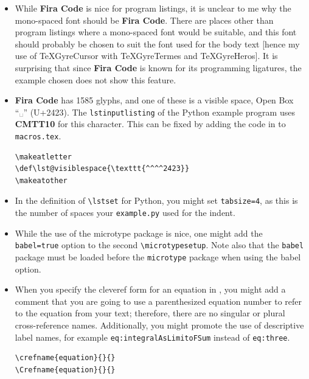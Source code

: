 \documentclass[12pt, twoside]{article}
\newcommand{\fname}[1]{\texttt{#1}}
\begin{document}
\begin{itemize}[label=\color{red}]
  \item While \textbf{Fira Code} is nice for program listings, it is unclear to me why the mono-spaced font should be \textbf{Fira Code}. There are places other than program listings where a mono-spaced font would be suitable, and this font should probably be chosen to suit the font used for the body text [hence my use of TeXGyreCursor with TeXGyreTermes and TeXGyreHeros]. It is surprising that since \textbf{Fira Code} is known for its programming ligatures, the example chosen does not show this feature.

  \item \textbf{Fira Code} has 1585 glyphs, and one of these is a visible space, \ie Open Box “␣” (U+2423). The \texttt{lstinputlisting} of the Python example program uses \textbf{CMTT10} for this character.
  This can be fixed by adding the code in  to \fname{macros.tex}.
  \begin{lstlisting}[style=latexExample, caption={Set the character used for a visible space in listings}, columns=fullflexible, showstringspaces=false, label=lst:svisiblespace]
\makeatletter
\def\lst@visiblespace{\texttt{^^^^2423}}
\makeatother
    \end{lstlisting}

\item In the definition of \texttt{\textbackslash lstset} for Python, you might set \texttt{tabsize=4}, as this is the number of spaces your \fname{example.py} used for the indent.

\item While the use of the microtype package is nice, one might add the \texttt{babel=true} option to the second \texttt{\textbackslash microtypesetup}. Note also that the \texttt{babel} package must be loaded before the \texttt{microtype} package when using the babel option.

\item When you specify the cleveref form for an equation in , you might add a comment that you are going to use a parenthesized equation number to refer to the equation from your text; therefore, there are no singular or plural cross-reference names.
Additionally, you might promote the use of descriptive label names, for example \texttt{eq:integralAsLimitoFSum} instead of \texttt{eq:three}.
  \begin{lstlisting}[style=latexExample, caption={Configuring cleveref for equations}, columns=fullflexible, showstringspaces=false, label=lst:eqcref]
\crefname{equation}{}{}
\Crefname{equation}{}{}
  \end{lstlisting}


\end{itemize}
\end{document}
